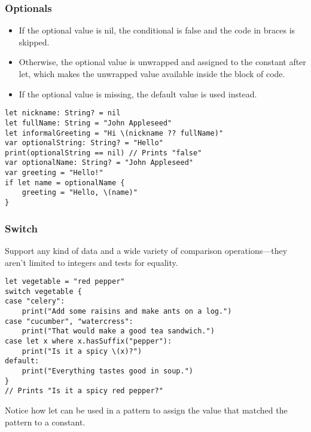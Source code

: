 \begin{frame}[fragile] \frametitle{Optionals}

\begin{itemize}
\item If the optional value is nil, the conditional is false and the code in braces is skipped. 
\item Otherwise, the optional value is unwrapped and assigned to the constant after let, which makes the unwrapped value available inside the block of code.
\item If the optional value is missing, the default value is used instead.
\end{itemize}

\begin{lstlisting}[basicstyle=\scriptsize]
let nickname: String? = nil
let fullName: String = "John Appleseed"
let informalGreeting = "Hi \(nickname ?? fullName)"
var optionalString: String? = "Hello"
print(optionalString == nil) // Prints "false"
var optionalName: String? = "John Appleseed"
var greeting = "Hello!"
if let name = optionalName {
    greeting = "Hello, \(name)"
}
\end{lstlisting}

\end{frame}

\begin{frame}[fragile] \frametitle{Switch}

Support any kind of data and a wide variety of comparison operations—they aren’t limited to integers and tests for equality.
 
\begin{lstlisting}[basicstyle=\scriptsize]
let vegetable = "red pepper"
switch vegetable {
case "celery":
    print("Add some raisins and make ants on a log.")
case "cucumber", "watercress":
    print("That would make a good tea sandwich.")
case let x where x.hasSuffix("pepper"):
    print("Is it a spicy \(x)?")
default:
    print("Everything tastes good in soup.")
}
// Prints "Is it a spicy red pepper?"
\end{lstlisting}

Notice how let can be used in a pattern to assign the value that matched the pattern to a constant.

\end{frame}


